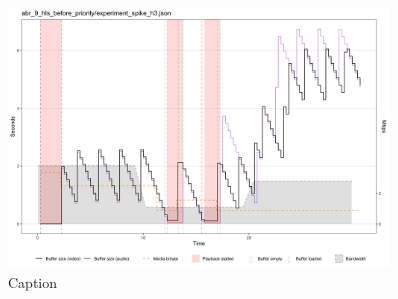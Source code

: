 \begin{figure}[h]
    \centering
    \includegraphics[width=0.9\textwidth]{res/eval_abr_spike_hls.png}
    \caption{Caption}
    \label{fig:eval_abr_hls}
\end{figure}

